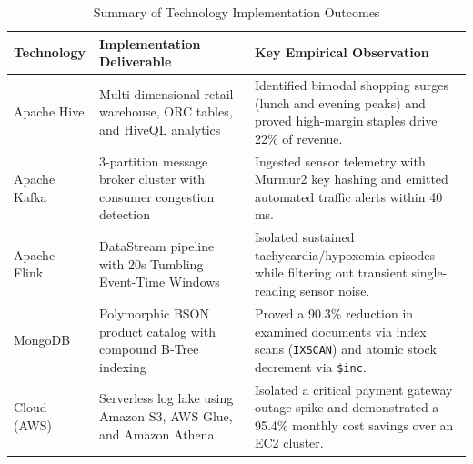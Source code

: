 \documentclass[12pt,a4paper]{report}
\begin{document}
\begin{table}[H]
\centering
\caption{Summary of Technology Implementation Outcomes}
\label{tab:summary_outcomes}
\begin{tabularx}{\textwidth}{|l|X|X|}
\hline
\textbf{Technology} & \textbf{Implementation Deliverable} & \textbf{Key Empirical Observation}\\
\hline
Apache Hive & Multi-dimensional retail warehouse, ORC tables, and HiveQL analytics & Identified bimodal shopping surges (lunch and evening peaks) and proved high-margin staples drive 22\% of revenue.\\
\hline
Apache Kafka & 3-partition message broker cluster with consumer congestion detection & Ingested sensor telemetry with Murmur2 key hashing and emitted automated traffic alerts within 40 ms.\\
\hline
Apache Flink & DataStream pipeline with 20s Tumbling Event-Time Windows & Isolated sustained tachycardia/hypoxemia episodes while filtering out transient single-reading sensor noise.\\
\hline
MongoDB & Polymorphic BSON product catalog with compound B-Tree indexing & Proved a 90.3\% reduction in examined documents via index scans (\texttt{IXSCAN}) and atomic stock decrement via \texttt{\$inc}.\\
\hline
Cloud (AWS) & Serverless log lake using Amazon S3, AWS Glue, and Amazon Athena & Isolated a critical payment gateway outage spike and demonstrated a 95.4\% monthly cost savings over an EC2 cluster.\\
\hline
\end{tabularx}
\end{table}
\end{document}
